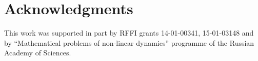 \documentclass[12pt]{article}
\begin{document}
\section*{Acknowledgments}
	This work was supported in part by RFFI grants 14-01-00341, 15-01-03148
	and by ``Mathematical problems of non-linear dynamics'' programme
	of the Russian Academy of Sciences.
\end{document}
